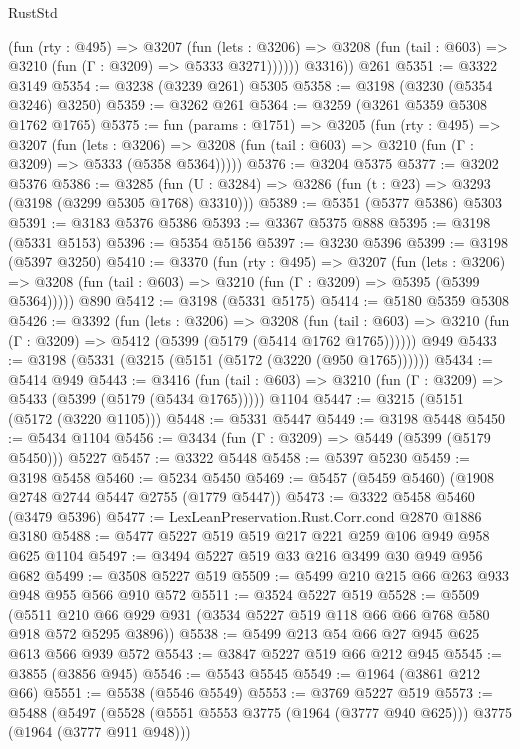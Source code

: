 \begin{lexlean}{RustStd}
\begin{coremodule}
            (fun (rty : @495) =>
            @3207
              (fun (lets : @3206) =>
              @3208 (fun (tail : @603) => @3210 (fun (Γ : @3209) => @5333 @3271))))))
        @3316))
    @261
@5351 := @3322 @3149
@5354 := @3238 (@3239 @261) @5305
@5358 := @3198 (@3230 (@5354 @3246) @3250)
@5359 := @3262 @261
@5364 := @3259 (@3261 @5359 @5308 @1762 @1765)
@5375 := fun (params : @1751) =>
  @3205
    (fun (rty : @495) =>
    @3207
      (fun (lets : @3206) =>
      @3208 (fun (tail : @603) => @3210 (fun (Γ : @3209) => @5333 (@5358 @5364)))))
@5376 := @3204 @5375
@5377 := @3202 @5376
@5386 := @3285 (fun (U : @3284) => @3286 (fun (t : @23) => @3293 (@3198 (@3299 @5305 @1768) @3310)))
@5389 := @5351 (@5377 @5386) @5303
@5391 := @3183 @5376 @5386
@5393 := @3367 @5375 @888
@5395 := @3198 (@5331 @5153)
@5396 := @5354 @5156
@5397 := @3230 @5396
@5399 := @3198 (@5397 @3250)
@5410 := @3370
    (fun (rty : @495) =>
    @3207
      (fun (lets : @3206) =>
      @3208 (fun (tail : @603) => @3210 (fun (Γ : @3209) => @5395 (@5399 @5364)))))
    @890
@5412 := @3198 (@5331 @5175)
@5414 := @5180 @5359 @5308
@5426 := @3392
    (fun (lets : @3206) =>
    @3208
      (fun (tail : @603) => @3210 (fun (Γ : @3209) => @5412 (@5399 (@5179 (@5414 @1762 @1765))))))
    @949
@5433 := @3198 (@5331 (@3215 (@5151 (@5172 (@3220 (@950 @1765))))))
@5434 := @5414 @949
@5443 := @3416
    (fun (tail : @603) => @3210 (fun (Γ : @3209) => @5433 (@5399 (@5179 (@5434 @1765)))))
    @1104
@5447 := @3215 (@5151 (@5172 (@3220 @1105)))
@5448 := @5331 @5447
@5449 := @3198 @5448
@5450 := @5434 @1104
@5456 := @3434 (fun (Γ : @3209) => @5449 (@5399 (@5179 @5450))) @5227
@5457 := @3322 @5448
@5458 := @5397 @5230
@5459 := @3198 @5458
@5460 := @5234 @5450
@5469 := @5457 (@5459 @5460) (@1908 @2748 @2744 @5447 @2755 (@1779 @5447))
@5473 := @3322 @5458 @5460 (@3479 @5396)
@5477 := LexLeanPreservation.Rust.Corr.cond @2870 @1886 @3180
@5488 := @5477 @5227 @519 @519 @217 @221 @259 @106 @949 @958 @625 @1104
@5497 := @3494 @5227 @519 @33 @216 @3499 @30 @949 @956 @682
@5499 := @3508 @5227 @519
@5509 := @5499 @210 @215 @66 @263 @933 @948 @955 @566 @910 @572
@5511 := @3524 @5227 @519
@5528 := @5509
    (@5511 @210 @66 @929 @931 (@3534 @5227 @519 @118 @66 @66 @768 @580 @918 @572 @5295 @3896))
@5538 := @5499 @213 @54 @66 @27 @945 @625 @613 @566 @939 @572
@5543 := @3847 @5227 @519 @66 @212 @945
@5545 := @3855 (@3856 @945)
@5546 := @5543 @5545
@5549 := @1964 (@3861 @212 @66)
@5551 := @5538 (@5546 @5549)
@5553 := @3769 @5227 @519
@5573 := @5488
    (@5497
      (@5528 (@5551 @5553 @3775 (@1964 (@3777 @940 @625))) @3775 (@1964 (@3777 @911 @948)))

\end{coremodule}
\end{lexlean}
